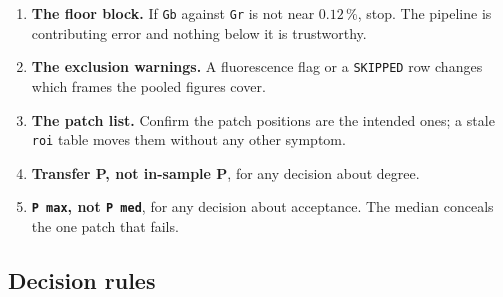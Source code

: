 \documentclass[11pt, a4paper]{article}
\newcommand{\code}[1]{\texttt{#1}}
\newcommand{\pct}{\,\%}
\begin{document}
\begin{enumerate}[nosep]
  \item \textbf{The floor block.}
        If \code{Gb} against \code{Gr} is not near $0.12\pct$,
        stop.
        The pipeline is contributing error
        and nothing below it is trustworthy.
  \item \textbf{The exclusion warnings.}
        A fluorescence flag or a \code{SKIPPED} row
        changes which frames the pooled figures cover.
  \item \textbf{The patch list.}
        Confirm the patch positions are the intended ones;
        a stale \code{roi} table moves them without any other symptom.
  \item \textbf{Transfer P, not in-sample P},
        for any decision about degree.
  \item \textbf{\code{P max}, not \code{P med}},
        for any decision about acceptance.
        The median conceals the one patch that fails.
\end{enumerate}

\subsection{Decision rules}
\end{document}
